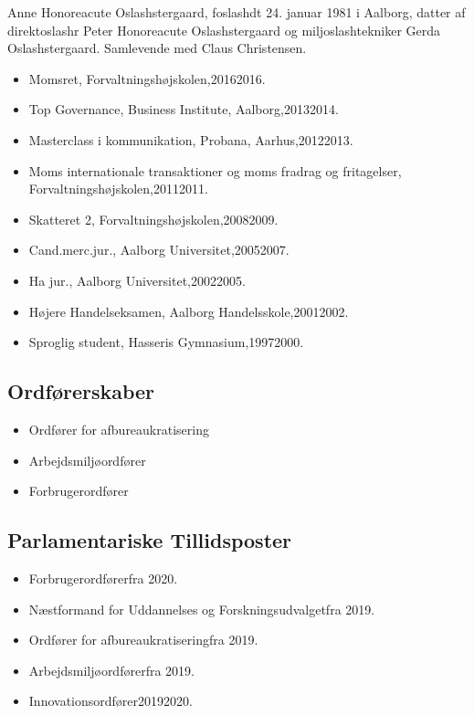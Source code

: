 \documentclass[11pt, a4paper]{awesome-cv}
\begin{document}
\makecvheader[R]
\makelettertitle
\begin{cvletter}
Anne Honoreacute Oslashstergaard, foslashdt 24. januar 1981 i Aalborg, datter af direktoslashr Peter Honoreacute Oslashstergaard og miljoslashtekniker Gerda Oslashstergaard. Samlevende med Claus Christensen.

\begin{itemize}
\item Momsret, Forvaltningshøjskolen,20162016.
\item Top Governance, Business Institute, Aalborg,20132014.
\item Masterclass i kommunikation, Probana, Aarhus,20122013.
\item Moms  internationale transaktioner og moms  fradrag og fritagelser, Forvaltningshøjskolen,20112011.
\item Skatteret 2, Forvaltningshøjskolen,20082009.
\item Cand.merc.jur., Aalborg Universitet,20052007.
\item Ha jur., Aalborg Universitet,20022005.
\item Højere Handelseksamen, Aalborg Handelsskole,20012002.
\item Sproglig student, Hasseris Gymnasium,19972000.
\end{itemize}
\subsection*{Ordførerskaber}
\begin{itemize}
\item Ordfører for afbureaukratisering
\item Arbejdsmiljøordfører
\item Forbrugerordfører
\end{itemize}
\subsection*{Parlamentariske Tillidsposter}
\begin{itemize}
\item Forbrugerordførerfra 2020.
\item Næstformand for Uddannelses og Forskningsudvalgetfra 2019.
\item Ordfører for afbureaukratiseringfra 2019.
\item Arbejdsmiljøordførerfra 2019.
\item Innovationsordfører20192020.
\end{itemize}

\end{cvletter}
\end{document}
